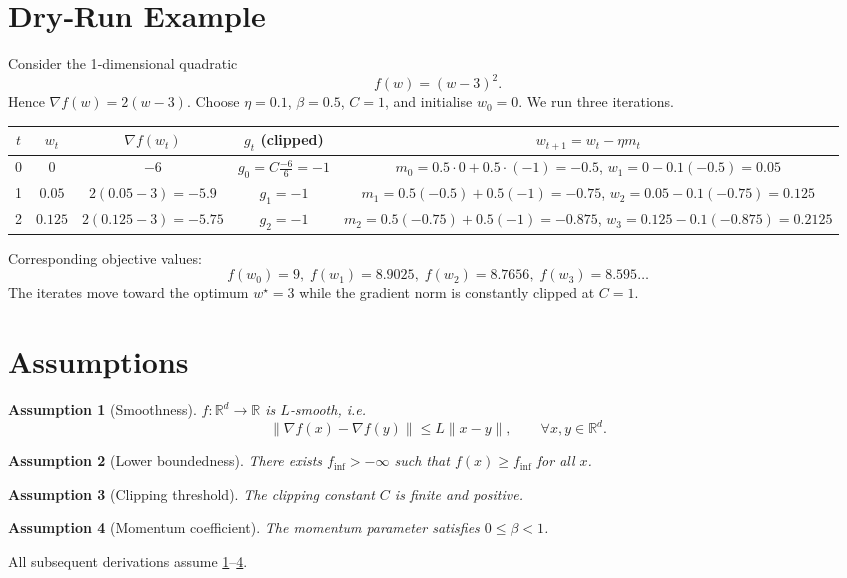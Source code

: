 \documentclass{article}
\newtheorem{assumption}{Assumption}
\newcommand{\R}{\mathbb{R}}
\begin{document}
\section*{Dry‑Run Example}
Consider the 1‑dimensional quadratic
\[
f(w)=(w-3)^2 .
\]
Hence $\nabla f(w)=2(w-3)$.  
Choose $\eta=0.1$, $\beta=0.5$, $C=1$, and initialise $w_0=0$.
We run three iterations.

\begin{center}
\begin{tabular}{c|c|c|c|c}
$t$ & $w_t$ & $\nabla f(w_t)$ & $g_t$ (clipped) & $w_{t+1}=w_t-\eta m_t$ \\ \hline
0 & $0$ & $-6$ & $g_0 = C\frac{-6}{6}= -1$ & $m_0=0.5\cdot0+0.5\cdot(-1)=-0.5$, $w_1=0-0.1(-0.5)=0.05$ \\[4pt]
1 & $0.05$ & $2(0.05-3)=-5.9$ & $g_1 = -1$ & $m_1=0.5(-0.5)+0.5(-1)=-0.75$, $w_2=0.05-0.1(-0.75)=0.125$ \\[4pt]
2 & $0.125$ & $2(0.125-3)=-5.75$ & $g_2 = -1$ & $m_2=0.5(-0.75)+0.5(-1)=-0.875$, $w_3=0.125-0.1(-0.875)=0.2125$
\end{tabular}
\end{center}

Corresponding objective values:
\[
f(w_0)=9,\; f(w_1)=8.9025,\; f(w_2)=8.7656,\; f(w_3)=8.595\ldots
\]
The iterates move toward the optimum $w^\star=3$ while the gradient norm is constantly clipped at $C=1$.

\newpage

\section*{Assumptions}
\begin{assumption}[Smoothness]\label{as:smooth}
$f:\R^{d}\to\R$ is $L$‑smooth, i.e.
\[
\|\nabla f(x)-\nabla f(y)\|\le L\|x-y\|,\qquad\forall x,y\in\R^{d}.
\tag{A1}
\]
\end{assumption}
\begin{assumption}[Lower boundedness]\label{as:lower}
There exists $f_{\inf}>-\infty$ such that $f(x)\ge f_{\inf}$ for all $x$.
\end{assumption}
\begin{assumption}[Clipping threshold]\label{as:clip}
The clipping constant $C$ is finite and positive.
\end{assumption}
\begin{assumption}[Momentum coefficient]\label{as:beta}
The momentum parameter satisfies $0\le\beta<1$.
\end{assumption}
All subsequent derivations assume \ref{as:smooth}–\ref{as:beta}.
\end{document}

